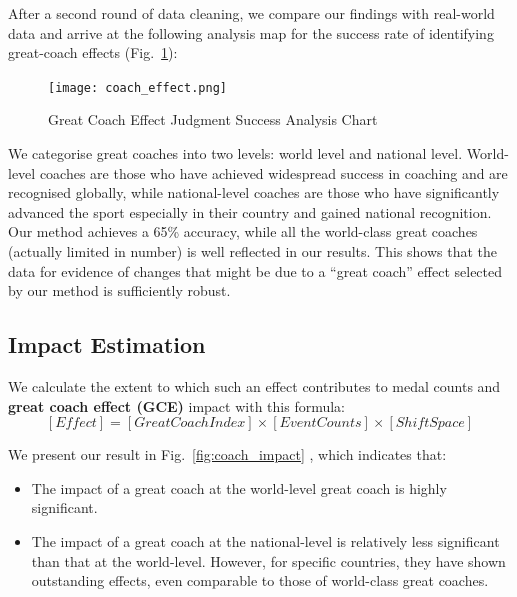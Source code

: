 \documentclass{mcmthesis}
\begin{document}
After a second round of data cleaning, we compare our findings with real-world data and arrive at the following analysis map for the success rate of identifying great-coach effects (Fig.~\ref{fig:coach_effect}):

\begin{figure}[h!]
    \centering
    \texttt{[image: coach\_effect.png]}
    \caption{Great Coach Effect Judgment Success Analysis Chart}
    \label{fig:coach_effect}
\end{figure}

We categorise great coaches into two levels: world level and national level. World-level coaches are those who have achieved widespread success in coaching and are recognised globally, while national-level coaches are those who have significantly advanced the sport especially in their country and gained national recognition. Our method achieves a 65\% accuracy, while all the world-class great coaches (actually limited in number) is well reflected in our results. This shows that the data for evidence of changes that might be due to a “great coach” effect selected by our method is sufficiently robust.


\subsection{Impact Estimation}

We calculate the extent to which such an effect contributes to medal counts and \textbf{great coach effect (GCE)} impact with this formula:
\[
[Effect]=[GreatCoachIndex] \times [EventCounts] \times [ShiftSpace]
\]

We present our result in Fig.~\ref{fig:coach_impact} , which indicates that:
\begin{itemize}
    \item The impact of a great coach at the world-level great coach is highly significant.
    \item The impact of a great coach at the national-level is relatively less significant than that at the world-level. However, for specific countries, they have shown outstanding effects, even comparable to those of world-class great coaches.
\end{itemize}
\end{document}
